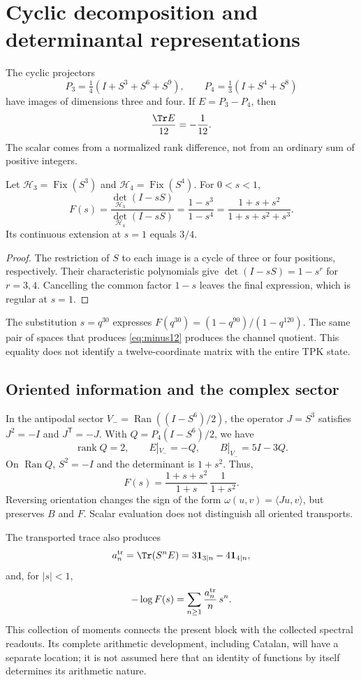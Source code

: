 \section{Cyclic decomposition and determinantal representations}
The cyclic projectors
\[
P_3=\tfrac14(I+S^3+S^6+S^9),\qquad
P_4=\tfrac13(I+S^4+S^8)
\]
have images of dimensions three and four. If $E=P_3-P_4$, then
\begin{equation}
\frac{\Tr E}{12}=-\frac1{12}.
\label{eq:minus12}
\end{equation}
The scalar comes from a normalized rank difference, not from an
ordinary sum of positive integers.

\begin{theorem}
Let $\mathcal H_3=\operatorname{Fix}(S^3)$ and
$\mathcal H_4=\operatorname{Fix}(S^4)$. For $0<s<1$,
\begin{equation}
F(s)=\frac{\det_{\mathcal H_3}(I-sS)}{\det_{\mathcal H_4}(I-sS)}
=\frac{1-s^3}{1-s^4}
=\frac{1+s+s^2}{1+s+s^2+s^3}.
\label{eq:det}
\end{equation}
Its continuous extension at $s=1$ equals $3/4$.
\end{theorem}
\begin{proof}
The restriction of $S$ to each image is a cycle of three or four
positions, respectively. Their characteristic polynomials give
$\det(I-sS)=1-s^r$ for $r=3,4$. Cancelling the common factor $1-s$
leaves the final expression, which is regular at $s=1$.
\end{proof}

The substitution $s=q^{30}$ expresses
$F(q^{30})=(1-q^{90})/(1-q^{120})$.
The same pair of spaces that produces \eqref{eq:minus12}
produces the channel quotient. This equality does not identify
a twelve-coordinate matrix with the entire TPK state.

\subsection{Oriented information and the complex sector}
In the antipodal sector $V_-=\operatorname{Ran}((I-S^6)/2)$,
the operator $J=S^3$ satisfies $J^2=-I$ and $J^{\mathsf T}=-J$.
With $Q=P_4(I-S^6)/2$, we have
\[
\operatorname{rank}Q=2,\qquad E|_{V_-}=-Q,\qquad B|_{V_-}=5I-3Q.
\]
On $\operatorname{Ran}Q$, $S^2=-I$ and the determinant is $1+s^2$.
Thus,
\[
F(s)=\frac{1+s+s^2}{1+s}\,\frac1{1+s^2}.
\]
Reversing orientation changes the sign of the form
$\omega(u,v)=\langle Ju,v\rangle$, but preserves $B$ and $F$.
Scalar evaluation does not distinguish all oriented transports.

The transported trace also produces
\[
a_n^{\rm tr}=\Tr(S^nE)=3\mathbf1_{3\mid n}-4\mathbf1_{4\mid n},
\]
and, for $|s|<1$,
\[
-\log F(s)=\sum_{n\ge1}\frac{a_n^{\rm tr}}n\,s^n.
\]
This collection of moments connects the present block with the collected
spectral readouts. Its complete arithmetic development, including
Catalan, will have a separate location; it is not assumed here that an
identity of functions by itself determines its arithmetic nature.
